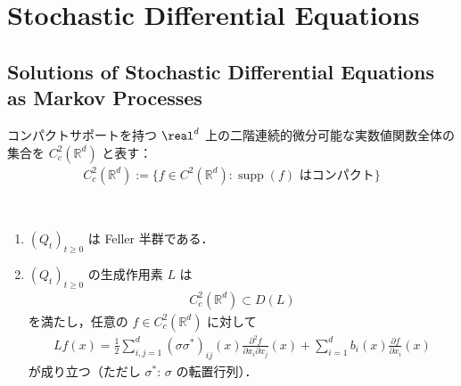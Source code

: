 \documentclass{jsarticle}
\title{}
\author{}
\date{
}
\begin{document}
\setcounter{section}{7}
\section{Stochastic Differential Equations}
\setcounter{subsection}{2}
\subsection{Solutions of Stochastic Differential Equations as Markov Processes}

コンパクトサポートを持つ $\real^d$ 上の二階連続的微分可能な実数値関数全体の集合を $C_c^2(\mathbb{R}^d)$ と表す：
\begin{align}
    C_c^2(\mathbb{R}^d)
    := \{f\in C^2(\mathbb{R}^d):\operatorname{supp}(f)\text{ はコンパクト}\}
\end{align}

\setcounter{thm}{6}
\begin{screen}
    \begin{thm}\label{thm:807}~
        \begin{enumerate}[label=(\arabic*)]
            \item
            $(Q_t)_{t\ge0}$ は Feller 半群である．
            \item
            $(Q_t)_{t\ge0}$ の生成作用素 $L$ は
            \begin{align}
                C_c^2(\mathbb{R}^d)
                \subset D(L)
            \end{align}
            を満たし，任意の $f\in C_c^2(\mathbb{R}^d)$ に対して
            \begin{align}
                Lf(x)
                = \frac{1}{2}\sum_{i, j=1}^{d}(\sigma\sigma^{\ast})_{ij}(x)\frac{\partial^{2}f}{\partial x_{i}\partial x_{j}}(x)
                + \sum_{i=1}^{d}b_{i}(x)\frac{\partial f}{\partial x_{i}}(x)
            \end{align}
            が成り立つ（ただし $\sigma^{\ast}$: $\sigma$ の転置行列）．
        \end{enumerate}
    \end{thm}
\end{screen}
\end{document}

